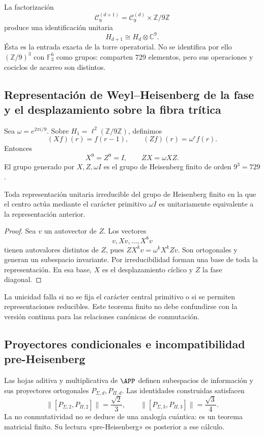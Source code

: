 La factorización
\[
  \mathcal C_9^{(d+1)}
  =
  \mathcal C_9^{(d)}\times\mathbb Z/9\mathbb Z
\]
produce una identificación unitaria
\[
  H_{d+1}\cong H_d\otimes\mathbb C^9.
\]
Ésta es la entrada exacta de la torre operatorial. No se identifica por ello
\((\mathbb Z/9)^3\) con \(\mathbb F_3^6\) como grupos: comparten \(729\)
elementos, pero sus operaciones y cociclos de acarreo son distintos.

\subsection{Representación de Weyl–Heisenberg de la fase y el desplazamiento sobre la fibra trítica}

Sea \(\omega=e^{2\pi i/9}\). Sobre
\(H_1=\ell^2(\mathbb Z/9\mathbb Z)\), definimos
\[
  (Xf)(r)=f(r-1),
  \qquad
  (Zf)(r)=\omega^r f(r).
\]
Entonces
\[
  X^9=Z^9=I,
  \qquad
  ZX=\omega XZ.
\]
El grupo generado por \(X,Z,\omega I\) es el grupo de Heisenberg finito de
orden \(9^3=729\).

\begin{theorem}
Toda representación unitaria irreducible del grupo de Heisenberg finito en
la que el centro actúa mediante el carácter primitivo
\(\omega I\) es unitariamente equivalente a la representación anterior.
\end{theorem}

\begin{proof}
Sea \(v\) un autovector de \(Z\). Los vectores
\[
  v,Xv,\ldots,X^8v
\]
tienen autovalores distintos de \(Z\), pues
\(ZX^kv=\omega^kX^kZv\). Son ortogonales y generan un subespacio
invariante. Por irreducibilidad forman una base de toda la representación.
En esa base, \(X\) es el desplazamiento cíclico y \(Z\) la fase diagonal.
\end{proof}

\begin{controlbox}
La unicidad falla si no se fija el carácter central primitivo o si se
permiten representaciones reducibles. Este teorema finito no debe confundirse
con la versión continua para las relaciones canónicas de conmutación.
\end{controlbox}

\subsection{Proyectores condicionales e incompatibilidad pre-Heisenberg}

Las hojas aditiva y multiplicativa de \(\APP\) definen subespacios de
información y sus proyectores ortogonales
\(P_{\Sigma,d},P_{\Pi,d}\). Las identidades construidas satisfacen
\[
 \|[P_{\Sigma,2},P_{\Pi,2}]\|
 =\frac{\sqrt2}{3},
 \qquad
 \|[P_{\Sigma,3},P_{\Pi,3}]\|
 =\frac{\sqrt3}{4}.
\]
La no conmutatividad no se deduce de una analogía cuántica: es un teorema
matricial finito. Su lectura «pre-Heisenberg» es posterior a ese cálculo.

